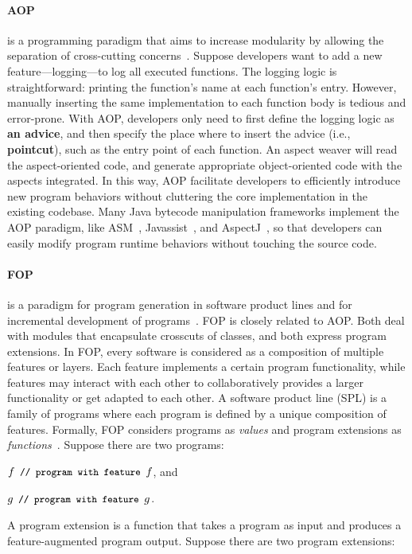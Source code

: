 \documentclass[runningheads,a4paper]{llncs}
\newcommand{\text}[1]{\footnotesize{\texttt{#1}}\normalsize}
\begin{document}
\paragraph{AOP} is a programming paradigm that aims to increase modularity by allowing the separation of cross-cutting concerns~\cite{Kiczales1997}. Suppose developers want to add a new feature---logging---to log all executed functions. 
The logging logic is straightforward: printing the function's name at each function's entry. However, manually inserting the same implementation to each function body is tedious and error-prone. With AOP, developers only need to first define the logging logic as \textbf{an advice}, and then specify the place where to insert the advice (i.e., \textbf{pointcut}), such as the entry point of each function. An aspect weaver will read the aspect-oriented code, and generate appropriate object-oriented code with the aspects integrated. In this way, AOP facilitate developers to efficiently introduce new program behaviors without cluttering the core implementation in the existing codebase. Many Java bytecode manipulation frameworks implement the AOP paradigm, like ASM~\cite{asm}, Javassist~\cite{javassist}, and AspectJ~\cite{aspectj}, so that developers can easily modify program runtime behaviors without touching the source code. 


\paragraph{FOP} is a paradigm for program generation in software product lines and for incremental development of programs~\cite{Batory1992:DIH}. 
FOP is closely related to AOP. Both deal with modules that encapsulate crosscuts of classes, and both express program extensions.
In FOP, every software is considered as a composition of multiple features or layers. Each feature implements a certain program functionality, while features may interact with each other to collaboratively provides a larger functionality or get adapted to each other.
A software product line (SPL) is a family of programs where each program is defined by a unique composition of features. Formally, FOP considers programs as \emph{values} and program extensions as \emph{functions}~\cite{Lammel2013:fop}. Suppose there are two programs: 

$f \text{	// program with feature }f$, and

$g\text{	// program with feature }g$.

\noindent
A program extension is a function that takes a program as input and produces a feature-augmented program output. Suppose there are two program extensions:
\end{document}
